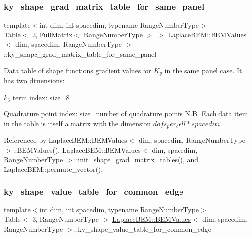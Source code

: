 \subsubsection{\texorpdfstring{ky\+\_\+shape\+\_\+grad\+\_\+matrix\+\_\+table\+\_\+for\+\_\+same\+\_\+panel}{ky\_shape\_grad\_matrix\_table\_for\_same\_panel}}
{\footnotesize\ttfamily template$<$int dim, int spacedim, typename Range\+Number\+Type$>$ \\
Table$<$ 2, Full\+Matrix$<$ Range\+Number\+Type $>$ $>$ \hyperlink{classLaplaceBEM_1_1BEMValues}{Laplace\+B\+E\+M\+::\+B\+E\+M\+Values}$<$ dim, spacedim, Range\+Number\+Type $>$\+::ky\+\_\+shape\+\_\+grad\+\_\+matrix\+\_\+table\+\_\+for\+\_\+same\+\_\+panel}

Data table of shape function\textquotesingle{}s gradient values for $K_y$ in the same panel case. It has two dimensions\+:
\begin{DoxyEnumerate}
\item $k_3$ term index\+: size=8
\item Quadrature point index\+: size=number of quadrature points N.\+B. Each data item in the table is itself a matrix with the dimension $dofs_per_cell*spacedim$. 
\end{DoxyEnumerate}

Referenced by Laplace\+B\+E\+M\+::\+B\+E\+M\+Values$<$ dim, spacedim, Range\+Number\+Type $>$\+::\+B\+E\+M\+Values(), Laplace\+B\+E\+M\+::\+B\+E\+M\+Values$<$ dim, spacedim, Range\+Number\+Type $>$\+::init\+\_\+shape\+\_\+grad\+\_\+matrix\+\_\+tables(), and Laplace\+B\+E\+M\+::permute\+\_\+vector().

\mbox{\label{classLaplaceBEM_1_1BEMValues_ab4fdc0a5ff8c0aa63e4901436e29598b}} 
\subsubsection{\texorpdfstring{ky\+\_\+shape\+\_\+value\+\_\+table\+\_\+for\+\_\+common\+\_\+edge}{ky\_shape\_value\_table\_for\_common\_edge}}
{\footnotesize\ttfamily template$<$int dim, int spacedim, typename Range\+Number\+Type$>$ \\
Table$<$ 3, Range\+Number\+Type $>$ \hyperlink{classLaplaceBEM_1_1BEMValues}{Laplace\+B\+E\+M\+::\+B\+E\+M\+Values}$<$ dim, spacedim, Range\+Number\+Type $>$\+::ky\+\_\+shape\+\_\+value\+\_\+table\+\_\+for\+\_\+common\+\_\+edge}

